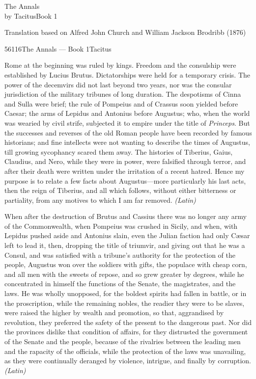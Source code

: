 
The Annals\\
by TacitusBook 1

Translation based on Alfred John Church and William Jackson Brodribb (1876)

56116The Annals — Book 1Tacitus


Rome at the beginning was ruled by kings. Freedom and the consulship were established by Lucius Brutus. Dictatorships were held for a temporary crisis. The power of the decemvirs did not last beyond two years, nor was the consular jurisdiction of the military tribunes of long duration. The despotisms of Cinna and Sulla were brief; the rule of Pompeius and of Crassus soon yielded before Caesar; the arms of Lepidus and Antonius before Augustus; who, when the world was wearied by civil strife, subjected it to empire under the title of \emph{Princeps}. But the successes and reverses of the old Roman people have been recorded by famous historians; and fine intellects were not wanting to describe the times of Augustus, till growing sycophancy scared them away. The histories of Tiberius, Gaius, Claudius, and Nero, while they were in power, were falsified through terror, and after their death were written under the irritation of a recent hatred. Hence my purpose is to relate a few facts about Augustus—more particularly his last acts, then the reign of Tiberius, and all which follows, without either bitterness or partiality, from any motives to which I am far removed. \emph{(Latin)}


When after the destruction of Brutus and Cassius there was no longer any army of the Commonwealth, when Pompeius was crushed in Sicily, and when, with Lepidus pushed aside and Antonius slain, even the Julian faction had only Cæsar left to lead it, then, dropping the title of triumvir, and giving out that he was a Consul, and was satisfied with a tribune's authority for the protection of the people, Augustus won over the soldiers with gifts, the populace with cheap corn, and all men with the sweets of repose, and so grew greater by degrees, while he concentrated in himself the functions of the Senate, the magistrates, and the laws. He was wholly unopposed, for the boldest spirits had fallen in battle, or in the proscription, while the remaining nobles, the readier they were to be slaves, were raised the higher by wealth and promotion, so that, aggrandised by revolution, they preferred the safety of the present to the dangerous past. Nor did the provinces dislike that condition of affairs, for they distrusted the government of the Senate and the people, because of the rivalries between the leading men and the rapacity of the officials, while the protection of the laws was unavailing, as they were continually deranged by violence, intrigue, and finally by corruption. \emph{(Latin)}

